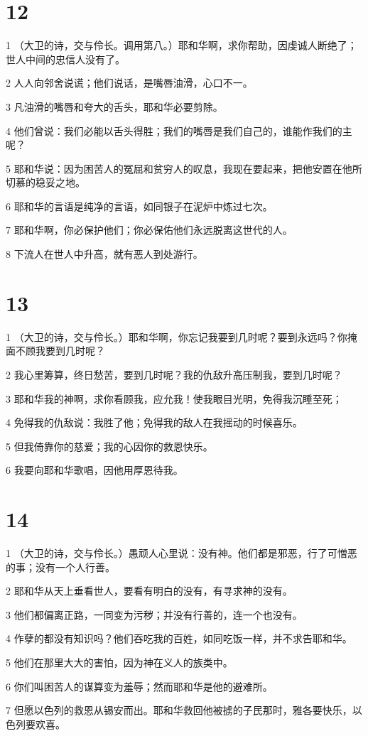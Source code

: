 \chapter{12}

\par 1 （大卫的诗，交与伶长。调用第八。）耶和华啊，求你帮助，因虔诚人断绝了；世人中间的忠信人没有了。
\par 2 人人向邻舍说谎；他们说话，是嘴唇油滑，心口不一。
\par 3 凡油滑的嘴唇和夸大的舌头，耶和华必要剪除。
\par 4 他们曾说：我们必能以舌头得胜；我们的嘴唇是我们自己的，谁能作我们的主呢？
\par 5 耶和华说：因为困苦人的冤屈和贫穷人的叹息，我现在要起来，把他安置在他所切慕的稳妥之地。
\par 6 耶和华的言语是纯净的言语，如同银子在泥炉中炼过七次。
\par 7 耶和华啊，你必保护他们；你必保佑他们永远脱离这世代的人。
\par 8 下流人在世人中升高，就有恶人到处游行。

\chapter{13}

\par 1 （大卫的诗，交与伶长。）耶和华啊，你忘记我要到几时呢？要到永远吗？你掩面不顾我要到几时呢？
\par 2 我心里筹算，终日愁苦，要到几时呢？我的仇敌升高压制我，要到几时呢？
\par 3 耶和华我的神啊，求你看顾我，应允我！使我眼目光明，免得我沉睡至死；
\par 4 免得我的仇敌说：我胜了他；免得我的敌人在我摇动的时候喜乐。
\par 5 但我倚靠你的慈爱；我的心因你的救恩快乐。
\par 6 我要向耶和华歌唱，因他用厚恩待我。

\chapter{14}

\par 1 （大卫的诗，交与伶长。）愚顽人心里说：没有神。他们都是邪恶，行了可憎恶的事；没有一个人行善。
\par 2 耶和华从天上垂看世人，要看有明白的没有，有寻求神的没有。
\par 3 他们都偏离正路，一同变为污秽；并没有行善的，连一个也没有。
\par 4 作孽的都没有知识吗？他们吞吃我的百姓，如同吃饭一样，并不求告耶和华。
\par 5 他们在那里大大的害怕，因为神在义人的族类中。
\par 6 你们叫困苦人的谋算变为羞辱；然而耶和华是他的避难所。
\par 7 但愿以色列的救恩从锡安而出。耶和华救回他被掳的子民那时，雅各要快乐，以色列要欢喜。

